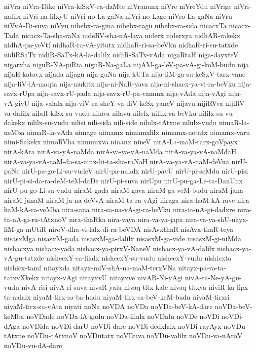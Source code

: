 {niVra
niVra-Dike
niVra-kiSxV-ra-daMte
niVranunx
niVre
niVreYdu
niVrige
niVri-nalilx
niVri-na-lilxyU
niVri-no-La-gaNa
niVri-no-Lage
niVro-La-gaNa
niVru
niVvA-Di-suva
niVvu
nibebx-ra-gina
nibebx-ragu
nibebx-ra-sida
nicacxTa
nicacx-Tada
nicacx-Ta-sha-raNa
nideRV-sha-nA-laya
niderx
niderxya
nidhAR-rakekx
nidhA-pa-yeVtf
nidhaR-ra-vA-yitutx
nidhaR-ri-sa-beVku
nidhaR-ri-su-tatxde
nidiRSaTx
nidiR-SaTx-kA-la-dalilx
nidiR-SaTx-vAda
nigaRtaH
niga-dayxteV
nigarxha
niguR-NA-piRta
niguR-Na-gaLa
nijAM-ga-leV-pa-vA-gi-koM-budu
nija
nijaE-katavx
nijada
nijagu
nija-guNa
nija-kUTa
nija-liM-ga-su-keSxV-tarx-vane
nija-liV-lA-maqta
nija-mukitx
nija-ni-NaR-yava
nija-ni-shacx-ya-vi-ra-beVku
nija-savx-rUpa
nija-savx-rU-pada
nija-savx-rU-pa-vanunx
nija-vAda
nija-vAgi
nija-vA-giyU
nija-valalx
nija-viV-ra-sheY-va-diV-keSx-yaneV
nijavu
nijiRVva
nijiRV-va-dalilx
nilaR-kiSx-su-vudu
nilava
nilavu
nilelx
nililx-sa-beVku
nililx-su-vu-dakekx
nililx-su-vudu
nilisi
nili-sida
nili-side
nilulx-tAtxne
nilulx-vudu
nimaR-la-neMba
nimaR-la-vAda
nimage
nimamx
nimamxlilx
nimamx-netatx
nimamx-varu
nimi-Sakekx
nimoRVha
nimumxva
ninanx
nineV
nirA-La-maM-tarx-goVpayx
nirA-kAra
nirA-va-yA-naMda
nirA-va-ya-vA-naMda
nirA-va-ya-vA-naMdaH
nirA-va-ya-vA-naM-da-sa-ninx-hi-ta-sha-raNaH
nirA-va-ya-vA-naM-deVna
nirU-paNe
nirU-pa-go-Li-su-vudeV
nirU-pa-nalalx
nirU-pavU
nirU-pi-seMdu
nirU-pisi
nirU-pi-si-da-ra-deM-teM-daDe
nirU-pi-suva
nirUpu
nirU-pu-ga-Le-ra-DanUnx
nirU-pu-go-Li-su-vudu
niraM-gada
niraM-gava
niraM-ga-veM-budu
niraM-jana
niraM-janaM
niraM-ja-na-deVvA
niraM-ta-ra-vAgi
niraga
nira-haM-kA-rave
nira-haM-kA-ra-veMba
nira-sana
nira-sa-na-vA-gi-ra-beVku
nira-ta-nA-gi-dadxre
nira-ta-nA-gi-ru-tAtxnoV
nira-thaRka
nira-vaya
nira-va-ya-japa
nira-va-ya-shU-nayx-liM-ga-mUtiR
niroV-dha-vi-lalx-di-ra-beVDA
nisAvxthaR
nisAvx-thaR-teya
nisasxMga
nisasxM-gada
nisasxM-ga-dalilx
nisasxM-ga-vide
nisasxM-gi-niMda
nishacxya
nishacx-yada
nishacx-ya-pirxV-NaneV
nishacx-ya-vA-dalilx
nishacx-ya-vA-gu-tatxde
nishecxY-sa-lilalx
nishecxY-su-vudu
nishecxY-vudu
nishicxta
nishicx-tamf
nitayxda
nitayx-miV-shA-na-maM-terxVNa
nitayx-pa-ra-ta-tatxvXkekx
nitayx-vAgi
nitayxvU
nitayxve
nivAR-Ni-yAgi
nivA-ra-Ne-yA-gu-vudu
nivA-risi
nivA-ri-suva
nivaR-yalu
nivaq-titx-kale
nivaq-titxya
niviR-ka-lipx-ta-nalalx
niyaM-tirx-sa-ba-hudu
niyaM-tirx-sa-beV-keM-budu
niyaM-tirxsi
niyaM-tirx-su-vAta
niyati
noNa
noVDA
noVDa
noVDa-beV-kA-dare
noVDa-beV-keMba
noVDade
noVDa-lA-gadu
noVDa-lilalx
noVDalu
noVDe
noVDi
noVDi-dAga
noVDida
noVDi-darU
noVDi-dare
noVDi-dedxlalx
noVDi-rayAyx
noVDu-tAtxne
noVDu-tAtxnoV
noVDutatx
noVDuva
noVDu-valilx
noVDu-va-nAroV
noVDu-vu-dA-dare
}
